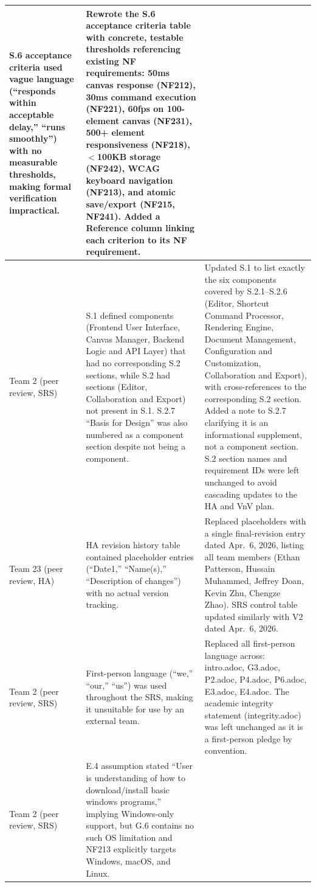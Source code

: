 \documentclass{article}
\begin{document}
\begin{tabularx}{\textwidth}{>{\hsize=0.4\hsize}X >{\hsize=0.8\hsize}X >{\hsize=1.8\hsize}X}
  S.6 acceptance criteria used vague language (``responds within acceptable delay,'' ``runs smoothly'') with no measurable thresholds, making formal verification impractical. &
  Rewrote the S.6 acceptance criteria table with concrete, testable thresholds referencing existing NF requirements: 50ms canvas response (NF212), 30ms command execution (NF221), 60fps on 100-element canvas (NF231), 500+ element responsiveness (NF218), $<$100KB storage (NF242), WCAG keyboard navigation (NF213), and atomic save/export (NF215, NF241). Added a Reference column linking each criterion to its NF requirement. \\
\midrule
Team 2 (peer review, SRS) &
  S.1 defined components (Frontend User Interface, Canvas Manager, Backend Logic and API Layer) that had no corresponding S.2 sections, while S.2 had sections (Editor, Collaboration and Export) not present in S.1. S.2.7 ``Basis for Design'' was also numbered as a component section despite not being a component. &
  Updated S.1 to list exactly the six components covered by S.2.1--S.2.6 (Editor, Shortcut Command Processor, Rendering Engine, Document Management, Configuration and Customization, Collaboration and Export), with cross-references to the corresponding S.2 section. Added a note to S.2.7 clarifying it is an informational supplement, not a component section. S.2 section names and requirement IDs were left unchanged to avoid cascading updates to the HA and VnV plan. \\
\midrule
Team 23 (peer review, HA) &
  HA revision history table contained placeholder entries (``Date1,'' ``Name(s),'' ``Description of changes'') with no actual version tracking. &
  Replaced placeholders with a single final-revision entry dated Apr.\ 6, 2026, listing all team members (Ethan Patterson, Hussain Muhammed, Jeffrey Doan, Kevin Zhu, Chengze Zhao). SRS control table updated similarly with V2 dated Apr.\ 6, 2026. \\
\midrule
Team 2 (peer review, SRS) &
  First-person language (``we,'' ``our,'' ``us'') was used throughout the SRS, making it unsuitable for use by an external team. &
  Replaced all first-person language across: intro.adoc, G3.adoc, P2.adoc, P4.adoc, P6.adoc, E3.adoc, E4.adoc. The academic integrity statement (integrity.adoc) was left unchanged as it is a first-person pledge by convention. \\
\midrule
Team 2 (peer review, SRS) &
  E.4 assumption stated ``User is understanding of how to download/install basic windows programs,'' implying Windows-only support, but G.6 contains no such OS limitation and NF213 explicitly targets Windows, macOS, and Linux. &

\end{tabularx}
\end{document}
